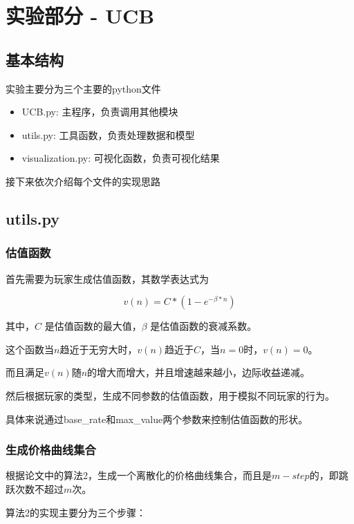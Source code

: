 \section{实验部分 - UCB}

\subsection{基本结构}

实验主要分为三个主要的python文件

\begin{itemize}
    \item UCB.py: 主程序，负责调用其他模块
    \item utils.py: 工具函数，负责处理数据和模型
    \item visualization.py: 可视化函数，负责可视化结果
\end{itemize}

接下来依次介绍每个文件的实现思路

\subsection{utils.py}

\subsubsection{估值函数}

首先需要为玩家生成估值函数，其数学表达式为

\[
   v(n) = C * (1 - e^{-\beta * n})
\]

其中，$C$ 是估值函数的最大值，$\beta$ 是估值函数的衰减系数。

这个函数当$n$趋近于无穷大时，$v(n)$趋近于$C$，当$n=0$时，$v(n)=0$。

而且满足$v(n)$随$n$的增大而增大，并且增速越来越小，边际收益递减。

然后根据玩家的类型，生成不同参数的估值函数，用于模拟不同玩家的行为。

具体来说通过base\_rate和max\_value两个参数来控制估值函数的形状。

\subsubsection{生成价格曲线集合}

根据论文中的算法2，生成一个离散化的价格曲线集合，而且是$m-step$的，即跳跃次数不超过$m$次。

算法2的实现主要分为三个步骤：

